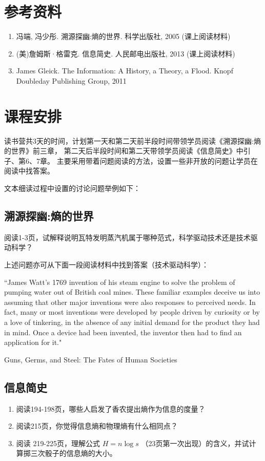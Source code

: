 \documentclass[12pt]{ctexart}
\begin{document}
\section{参考资料}
\begin{enumerate}
\item 冯端, 冯少彤. 溯源探幽:熵的世界. 科学出版社, 2005 (课上阅读材料)
\item (美)詹姆斯·格雷克. 信息简史. 人民邮电出版社, 2013 (课上阅读材料)
\item James Gleick. The Information: A History, a Theory, a Flood. Knopf Doubleday Publishing Group, 2011
\end{enumerate}

\section{课程安排}
读书营共3天的时间，计划第一天和第二天前半段时间带领学员阅读《溯源探幽:熵的世界》前三章，
第二天后半段时间和第二天带领学员阅读《信息简史》中引子、第6、7章。
主要采用带着问题阅读的方法，设置一些非开放的问题让学员在阅读中找答案。

文本细读过程中设置的讨论问题举例如下：


\subsection{溯源探幽:熵的世界}

阅读1-3页，试解释说明瓦特发明蒸汽机属于哪种范式，科学驱动技术还是技术驱动科学？

上述问题亦可从下面一段阅读材料中找到答案（技术驱动科学）：

``James Watt’s 1769 invention of his steam engine to solve the problem of pumping water out of British coal mines.
These familiar examples deceive us into assuming that other major inventions were also responses to perceived needs. In fact, many or most inventions were developed by people driven by curiosity or by a love of tinkering, in the absence of any initial demand for the product they had in mind. Once a device had been invented, the inventor then had to find an application for it."
\begin{flushright}
Guns, Germs, and Steel: The Fates of Human Societies
\end{flushright}

\subsection{信息简史}
\begin{enumerate}
  \item 阅读194-198页，哪些人启发了香农提出熵作为信息的度量？
  \item 阅读215页，你觉得信息熵和物理熵有什么相同点？
  \item 阅读 219-225页，理解公式 $H=n\log s$ （23页第一次出现）的含义，并试计算掷三次骰子的信息熵的大小。
\end{enumerate}
\end{document}
